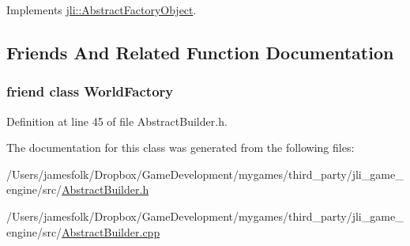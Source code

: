 Implements \hyperlink{classjli_1_1_abstract_factory_object_a9971edc5976c06cbfae1b0ae80722a43}{jli\+::\+Abstract\+Factory\+Object}.



\subsection{Friends And Related Function Documentation}
\hypertarget{classjli_1_1_abstract_builder_acb96ebb09abe8f2a37a915a842babfac}{
\subsubsection[{World\+Factory}]{\setlength{\rightskip}{0pt plus 5cm}friend class {\bf World\+Factory}\hspace{0.3cm}{\ttfamily [friend]}}}\label{classjli_1_1_abstract_builder_acb96ebb09abe8f2a37a915a842babfac}


Definition at line 45 of file Abstract\+Builder.\+h.



The documentation for this class was generated from the following files\+:\begin{DoxyCompactItemize}
\item 
/\+Users/jamesfolk/\+Dropbox/\+Game\+Development/mygames/third\+\_\+party/jli\+\_\+game\+\_\+engine/src/\hyperlink{_abstract_builder_8h}{Abstract\+Builder.\+h}\item 
/\+Users/jamesfolk/\+Dropbox/\+Game\+Development/mygames/third\+\_\+party/jli\+\_\+game\+\_\+engine/src/\hyperlink{_abstract_builder_8cpp}{Abstract\+Builder.\+cpp}\end{DoxyCompactItemize}
